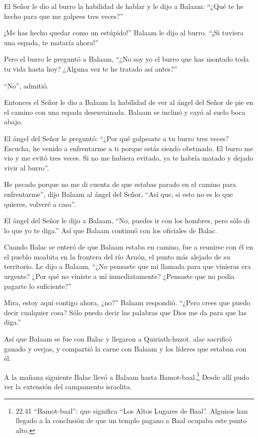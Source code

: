  El Señor le dio al burro la habilidad de hablar y le dijo
a Balaam: ``¿Qué te he hecho para que me golpees tres veces?''

 ¡Me has hecho quedar como un estúpido!'' Balaam le dijo al
burro. ``¡Si tuviera una espada, te mataría ahora!''

 Pero el burro le preguntó a Balaam, ``¿No soy yo el burro
que has montado toda tu vida hasta hoy? ¿Alguna vez te he tratado así
antes?''

``No'', admitió.

 Entonces el Señor le dio a Balaam la habilidad de ver al
ángel del Señor de pie en el camino con una espada desenvainada. Balaam
se inclinó y cayó al suelo boca abajo.

 El ángel del Señor le preguntó: ``¿Por qué golpeaste a tu
burro tres veces? Escucha, he venido a enfrentarme a ti porque estás
siendo obstinado.  El burro me vio y me evitó tres veces.
Si no me hubiera evitado, ya te habría matado y dejado vivir al burro''.

 He pecado porque no me di cuenta de que estabas parado en
el camino para enfrentarme'', dijo Balaam al ángel del Señor, ``Así que,
si esto no es lo que quieres, volveré a casa''.

 El ángel del Señor le dijo a Balaam, ``No, puedes ir con
los hombres, pero sólo di lo que yo te diga.'' Así que Balaam continuó
con los oficiales de Balac.

 Cuando Balac se enteró de que Balaam estaba en camino, fue
a reunirse con él en el pueblo moabita en la frontera del río Arnón, el
punto más alejado de su territorio.  Le dijo a Balaam,
``¿No pensaste que mi llamada para que vinieras era urgente? ¿Por qué no
viniste a mí inmediatamente? ¿Pensaste que no podía pagarte lo
suficiente?''

 Mira, estoy aquí contigo ahora, ¿no?'' Balaam respondió.
``¿Pero crees que puedo decir cualquier cosa? Sólo puedo decir las
palabras que Dios me da para que las diga.''

 Así que Balaam se fue con Balac y llegaron a
Quiriath-huzot.  alac sacrificó ganado y ovejas, y
compartió la carne con Balaam y los líderes que estaban con él.

 A la mañana siguiente Balac llevó a Balaam hasta
Bamot-baal.\footnote{22.41 ``Bamot-baal'': que significa ``Los Altos
  Lugares de Baal''. Algunos han llegado a la conclusión de que un
  templo pagano a Baal ocupaba este punto alto.} Desde allí pudo ver la
extensión del campamento israelita.

